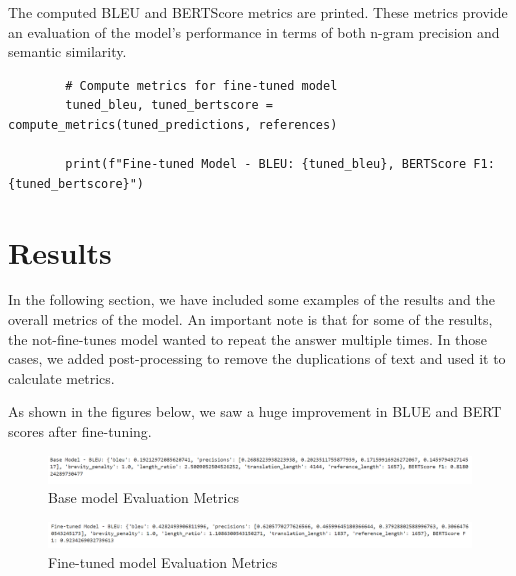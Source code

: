 \documentclass{solutionclass} %
\begin{document}
\begin{solution}
	The computed BLEU and BERTScore metrics are printed. These metrics provide an evaluation of the model’s performance in terms of both n-gram precision and semantic similarity.
	\begin{lstlisting}
		# Compute metrics for fine-tuned model
		tuned_bleu, tuned_bertscore = compute_metrics(tuned_predictions, references)
		
		print(f"Fine-tuned Model - BLEU: {tuned_bleu}, BERTScore F1: {tuned_bertscore}")
	\end{lstlisting}
\end{solution}


\section{Results}

In the following section, we have included some examples of the results and the overall metrics of the model. An important note is that for some of the results, the not-fine-tunes model wanted to repeat the answer multiple times. In those cases, we added post-processing to remove the duplications of text and used it to calculate metrics.

As shown in the figures below, we saw a huge improvement in BLUE and BERT scores after fine-tuning.




\begin{figure}[h!]
	\centering
	\includegraphics[width=1.0\textwidth]{img/3/base.png}
		\caption{Base model Evaluation Metrics}
\end{figure}


\begin{figure}[h!]
	\centering
	\includegraphics[width=1.0\textwidth]{img/3/ft.png}
	\caption{Fine-tuned model Evaluation Metrics}
\end{figure}
\end{document}
